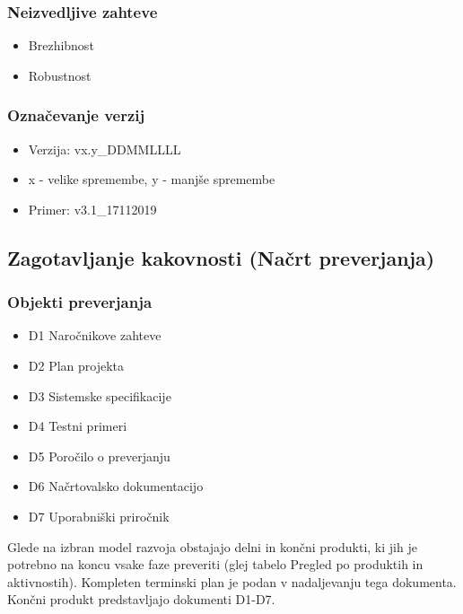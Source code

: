 \documentclass[a4paper,12pt]{article}
\begin{document}
		\subsubsection{Neizvedljive zahteve}

				\begin{itemize}
					\item Brezhibnost
					\item Robustnost
				\end{itemize}

		\subsubsection{Označevanje verzij}

				\begin{itemize}
					\item Verzija: vx.y\_DDMMLLLL
					\item x - velike spremembe, y - manjše spremembe
					\item Primer: v3.1\_17112019
				\end{itemize}

	\subsection{Zagotavljanje kakovnosti (Načrt preverjanja)}

\setul{0.6ex}{0.17ex}



		\subsubsection{Objekti preverjanja}

			\begin{itemize}
				\item D1 	Naročnikove zahteve
				\item D2 	Plan projekta
				\item D3 	Sistemske specifikacije
				\item D4 	Testni primeri
				\item D5 	Poročilo o preverjanju
				\item D6 	Načrtovalsko dokumentacijo
				\item D7 	Uporabniški priročnik	
			\end{itemize}

			Glede na izbran model razvoja obstajajo delni in končni produkti, 
			ki jih je potrebno na koncu vsake faze preveriti (glej tabelo 
			Pregled po produktih in aktivnostih). Kompleten terminski plan 
			je podan v nadaljevanju tega dokumenta. Končni produkt 
			predstavljajo dokumenti D1-D7.
\end{document}
